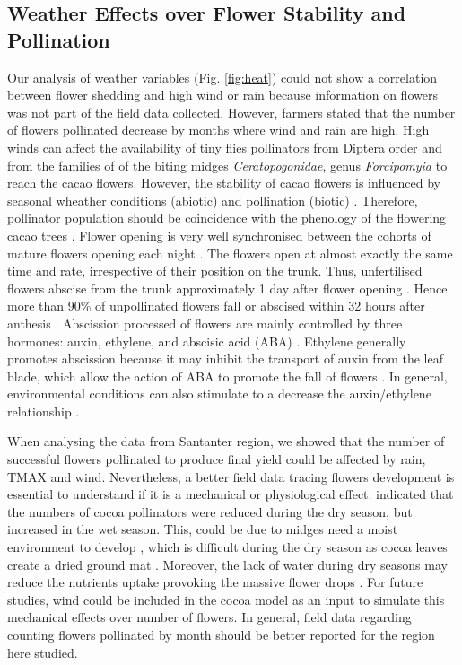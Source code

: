 \documentclass[gene,journal,article,submit,moreauthors,pdftex]{Definitions/mdpi}
\begin{document}
\subsection{Weather Effects over Flower Stability and Pollination}

Our analysis of weather variables (Fig. \ref{fig:heat}) could not show a correlation between flower shedding and high wind or rain because information on flowers was not part of the field data collected. However, farmers stated that the number of flowers pollinated decrease by months where wind and rain are high. High winds can affect the availability of tiny flies pollinators from Diptera order and from the families of of the biting midges \textit{Ceratopogonidae},  genus  \textit{Forcipomyia} \citep{Saunders1959, kaufmann1975, sotomayor2020} to reach the cacao flowers. However, the stability of cacao flowers is influenced by seasonal wheather conditions (abiotic) and pollination (biotic) \citep{Frimpong2014}. Therefore, pollinator population should be coincidence with the phenology of the flowering cacao trees \citep{Young1983, Young2012}. Flower opening is very well synchronised between the cohorts of mature flowers opening each night \citep{Niemenak2010}. The flowers open at almost exactly the same time and rate, irrespective of their position on the trunk. Thus, unfertilised flowers abscise from the trunk approximately 1 day after flower opening  \citep{Niemenak2010}. Hence more than 90\% of unpollinated flowers fall or abscised within 32 hours after  anthesis \citep{Aneja1999}. Abscission processed of  flowers are mainly controlled  by  three  hormones: auxin, ethylene, and abscisic acid (ABA) \citep{Aneja1999}. Ethylene generally promotes abscission because it may  inhibit the transport of auxin from the leaf blade, which allow the action of ABA to promote the fall of flowers \citep{Beyer1975}. In general, environmental conditions can also  stimulate   to  a  decrease  the  auxin/ethylene relationship \citep{Aneja1999}.

When analysing the data from  Santanter region, we showed that the number of successful flowers pollinated to produce final yield could be affected by rain, TMAX and wind. Nevertheless, a better field data tracing flowers development is essential to understand if it is a mechanical or physiological effect.  \cite{Frimpong2009, Frimpong2011} indicated that the numbers of cocoa pollinators were reduced during the dry season, but increased in the wet season. This, could be due to midges need a moist environment to develop \citep{Frimpong2014}, which is difficult during the dry season as cocoa leaves create a dried ground mat \citep{Frimpong2009, Frimpong2014}. Moreover, the lack of water during dry seasons may reduce the nutrients uptake provoking the massive flower drops \citep{Vaughton2017}.  For future studies, wind could be included in the cocoa model as an input to simulate this mechanical effects over number of flowers. In general, field data regarding counting flowers pollinated by month should be better reported for the region here studied. 
\end{document}
